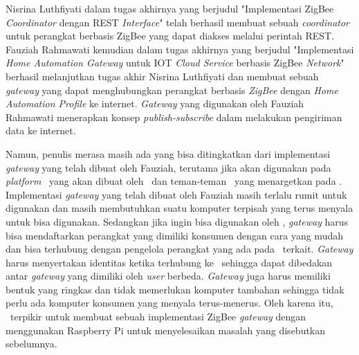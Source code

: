 Nisrina Luthfiyati dalam tugas akhirnya yang berjudul "Implementasi ZigBee \textit{Coordinator} dengan REST \textit{Interface}"\cite{SkripsiNina} telah berhasil membuat sebuah \textit{coordinator} untuk perangkat berbasis ZigBee yang dapat diakses melalui perintah REST. Fauziah Rahmawati kemudian dalam tugas akhirnya yang berjudul "Implementasi \textit{Home Automation Gateway} untuk IOT \textit{Cloud Service} berbasis ZigBee \textit{Network}"\cite{SkripsiFarah} berhasil melanjutkan tugas akhir Nisrina Luthfiyati dan membuat sebuah \textit{gateway} yang dapat menghubungkan perangkat berbasis \textit{ZigBee} dengan \textit{Home Automation Profile} ke internet. \textit{Gateway} yang digunakan oleh Fauziah Rahmawati menerapkan konsep \textit{publish-subscribe} dalam melakukan pengiriman data ke internet.

Namun, penulis merasa masih ada yang bisa ditingkatkan dari implementasi \textit{gateway} yang telah dibuat oleh Fauziah, terutama jika akan digunakan pada \textit{platform} \iot~yang akan dibuat oleh \saya~dan teman-teman \saya~yang menargetkan pada \eu. Implementasi \textit{gateway} yang telah dibuat oleh Fauziah masih terlalu rumit untuk digunakan dan masih membutuhkan suatu komputer terpisah yang terus menyala untuk bisa digunakan. Sedangkan jika ingin bisa digunakan oleh \eu, \textit{gateway} harus bisa mendaftarkan perangkat yang dimiliki konsumen dengan cara yang mudah dan bisa terhubung dengan pengelola perangkat yang ada pada \plat~terkait. \textit{Gateway} harus menyertakan identitas ketika terhubung ke \plat~sehingga dapat dibedakan antar \textit{gateway} yang dimiliki oleh \textit{user} berbeda. \textit{Gateway} juga harus memiliki bentuk yang ringkas dan tidak memerlukan komputer tambahan sehingga tidak perlu ada komputer konsumen yang menyala terus-menerus. Oleh karena itu, \saya~terpikir untuk membuat sebuah implementasi ZigBee \textit{gateway} dengan menggunakan Raspberry Pi untuk menyelesaikan masalah yang disebutkan sebelumnya.


